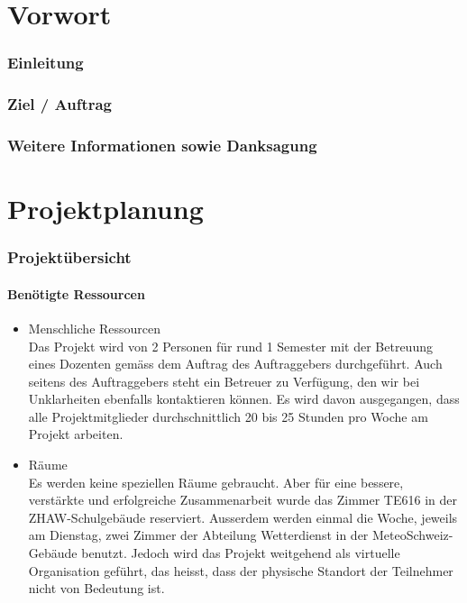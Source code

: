 \documentclass[a4paper,10pt]{article}
\begin{document}
\cleardoublepage
\begingroup
\pagestyle{empty}
\setcounter{tocdepth}{2}
\tableofcontents
\clearpage
\endgroup
       
\newpage

\setcounter{page}{1} 
\part{Vorwort}
\section{Einleitung}

\section{Ziel / Auftrag}

\section{Weitere Informationen sowie Danksagung}

\newpage
\part{Projektplanung}

\section{Projektübersicht}

\subsection{Benötigte Ressourcen}
\begin{itemize}
\item Menschliche Ressourcen \\
Das Projekt wird von 2 Personen für rund 1 Semester mit der Betreuung eines Dozenten gemäss dem Auftrag des Auftraggebers durchgeführt. Auch seitens des Auftraggebers steht ein Betreuer zu Verfügung, den wir bei Unklarheiten ebenfalls kontaktieren können. Es wird davon ausgegangen, dass alle Projektmitglieder durchschnittlich 20 bis 25 Stunden pro Woche am Projekt arbeiten.\\
\item Räume \\
Es werden keine speziellen Räume gebraucht. Aber für eine bessere, verstärkte und erfolgreiche Zusammenarbeit wurde das Zimmer TE616 in der ZHAW-Schulgebäude reserviert. Ausserdem werden einmal die Woche, jeweils am Dienstag, zwei Zimmer der Abteilung Wetterdienst in der MeteoSchweiz-Gebäude benutzt. Jedoch wird das Projekt weitgehend als virtuelle Organisation geführt, das heisst, dass der physische Standort der Teilnehmer nicht von Bedeutung ist.

\end{itemize}
\end{document}
